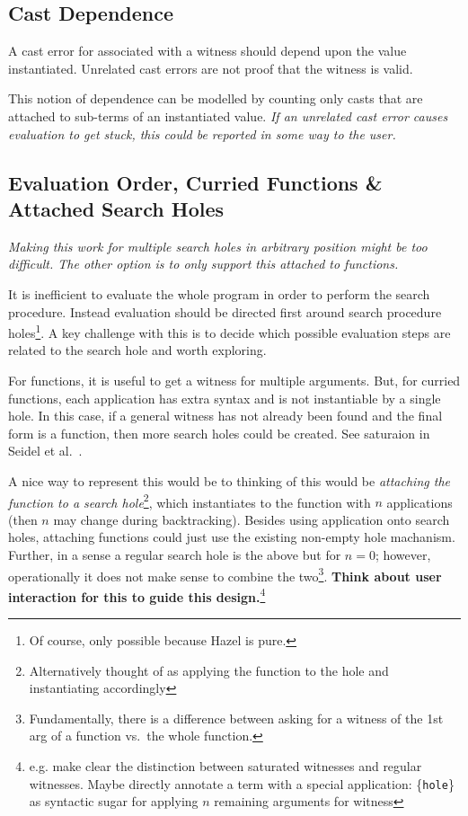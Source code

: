 \subsection{Cast Dependence}
A cast error for associated with a witness should depend upon the value instantiated. Unrelated cast errors are not proof that the witness is valid.\par 
This notion of dependence can be modelled by counting only casts that are attached to sub-terms of an instantiated value. \textit{If an unrelated cast error causes evaluation to get stuck, this could be reported in some way to the user.}\par 

\subsection{Evaluation Order, Curried Functions \& Attached Search Holes}
\textit{Making this work for multiple search holes in arbitrary position might be too difficult. The other option is to only support this attached to functions.}\par
It is inefficient to evaluate the whole program in order to perform the search procedure. Instead evaluation should be directed first around search procedure holes\footnote{Of course, only possible because Hazel is pure.}. A key challenge with this is to decide which possible evaluation steps are related to the search hole and worth exploring.\par 
For functions, it is useful to get a witness for multiple arguments. But, for curried functions, each application has extra syntax and is not instantiable by a single hole. In this case, if a general witness has not already been found and the final form is a function, then more search holes could be created. See saturaion in Seidel et al.\ \cite{SearchProc}.\par 
A nice way to represent this would be to thinking of this would be \textit{attaching the function to a search hole}\footnote{Alternatively thought of as applying the function to the hole and instantiating accordingly}, which instantiates to the function with $n$ applications (then $n$ may change during backtracking). Besides using application onto search holes, attaching functions could just use the existing non-empty hole machanism. Further, in a sense a regular search hole is the above but for $n=0$; however, operationally it does not make sense to combine the two\footnote{Fundamentally, there is a difference between asking for a witness of the 1st arg of a function vs.\ the whole function.}. \textbf{Think about user interaction for this to guide this design.}\footnote{e.g. make clear the distinction between saturated witnesses and regular witnesses. Maybe directly annotate a term with a special application: \{\texttt{hole}\} as syntactic sugar for applying $n$ remaining arguments for witness}

